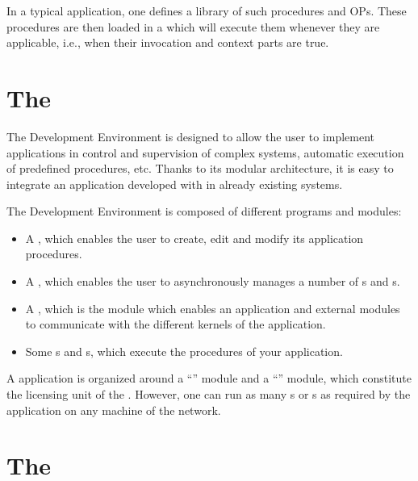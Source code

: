 In a typical \COPRS{} application, one defines a library of such procedures and
OPs. These procedures are then loaded in a \CPK{} which will execute them
whenever they are applicable, i.e., when their invocation and context parts are
true.

\section{The \COPRSDE{}}

The \COPRS{} Development Environment is designed to allow the user to implement
applications in control and supervision of complex systems, automatic execution
of predefined procedures, etc. Thanks to its modular architecture, it is easy
to integrate an application developed with \COPRS{} in already existing systems.


The \COPRS{} Development Environment is composed of different programs and
modules:

\begin{itemize}

\item A \OPE{}, which enables the user to create, edit and modify its
application procedures.

\item A \OPRSS{}, which enables the user to asynchronously manages a
number of \CPK{}s and \XPK{}s.

\item A \MP{} , which is the module which enables an application and external
modules to communicate with the different kernels of the \COPRS{} application.

\item Some \CPK{}s and \XPK{}s, which execute the procedures of your
application.

\end{itemize}


A \COPRS{} application is organized around a ``\MP{}'' module and a
``\OPRSS{}'' module, which constitute the licensing unit of the \COPRSDE{}.
However, one can run as many \CPK{}s or \XPK{}s as required by the application on any 
machine of the network.

\section{The \COPRSAE{}}

